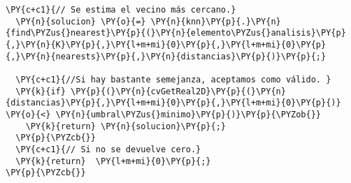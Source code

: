 \begin{Verbatim}[commandchars=\\\{\}]
  \PY{c+c1}{// Se estima el vecino más cercano.}
  \PY{n}{solucion} \PY{o}{=} \PY{n}{knn}\PY{p}{.}\PY{n}{find\PYZus{}nearest}\PY{p}{(}\PY{n}{elemento\PYZus{}analisis}\PY{p}{,}\PY{n}{K}\PY{p}{,}\PY{l+m+mi}{0}\PY{p}{,}\PY{l+m+mi}{0}\PY{p}{,}\PY{n}{nearests}\PY{p}{,}\PY{n}{distancias}\PY{p}{)}\PY{p}{;}
   
  \PY{c+c1}{//Si hay bastante semejanza, aceptamos como válido. }
  \PY{k}{if} \PY{p}{(}\PY{n}{cvGetReal2D}\PY{p}{(}\PY{n}{distancias}\PY{p}{,}\PY{l+m+mi}{0}\PY{p}{,}\PY{l+m+mi}{0}\PY{p}{)} \PY{o}{<} \PY{n}{umbral\PYZus{}minimo}\PY{p}{)}\PY{p}{\PYZob{}} 
	\PY{k}{return} \PY{n}{solucion}\PY{p}{;}
  \PY{p}{\PYZcb{}}
  \PY{c+c1}{// Si no se devuelve cero.}
  \PY{k}{return}  \PY{l+m+mi}{0}\PY{p}{;}
\PY{p}{\PYZcb{}}
\end{Verbatim}

